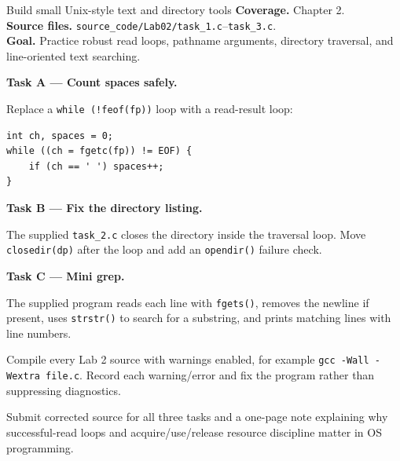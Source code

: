 \begin{labproject}{Build small Unix-style text and directory tools}
\textbf{Coverage.} Chapter 2.\\
\textbf{Source files.} \texttt{source\_code/Lab02/task\_1.c}--\texttt{task\_3.c}.\\
\textbf{Goal.} Practice robust read loops, pathname arguments, directory traversal, and line-oriented text searching.

\medskip\noindent\textbf{Task A --- Count spaces safely.}\par
Replace a \texttt{while (!feof(fp))} loop with a read-result loop:
\begin{lstlisting}[style=osc]
int ch, spaces = 0;
while ((ch = fgetc(fp)) != EOF) {
    if (ch == ' ') spaces++;
}
\end{lstlisting}

\medskip\noindent\textbf{Task B --- Fix the directory listing.}\par
The supplied \texttt{task\_2.c} closes the directory inside the traversal loop. Move \texttt{closedir(dp)} after the loop and add an \texttt{opendir()} failure check.

\medskip\noindent\textbf{Task C --- Mini grep.}\par
The supplied program reads each line with \texttt{fgets()}, removes the newline if present, uses \texttt{strstr()} to search for a substring, and prints matching lines with line numbers.

\begin{debugtask}
Compile every Lab 2 source with warnings enabled, for example \texttt{gcc -Wall -Wextra file.c}. Record each warning/error and fix the program rather than suppressing diagnostics.
\end{debugtask}
\end{labproject}

\begin{labdeliverable}
Submit corrected source for all three tasks and a one-page note explaining why successful-read loops and acquire/use/release resource discipline matter in OS programming.
\end{labdeliverable}
